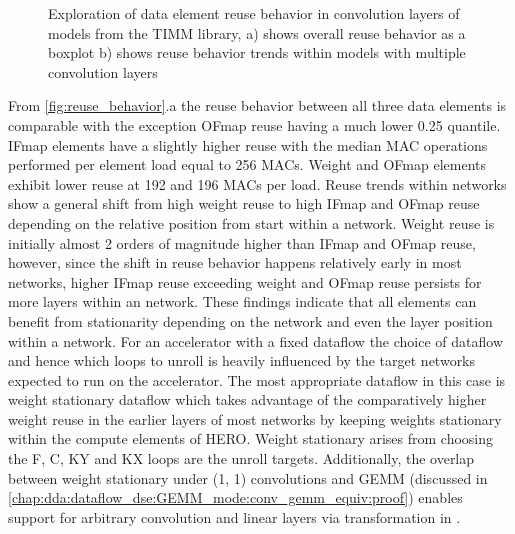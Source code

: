\begin{figure}
    \centering
    \caption{Exploration of data element reuse behavior in convolution layers of models from the TIMM library, a) shows overall reuse behavior as a boxplot b) shows reuse behavior trends within models with multiple convolution layers}
    \label{fig:reuse_behavior}
\end{figure}


From \autoref{fig:reuse_behavior}.a the reuse behavior between all three data
elements is comparable with the exception OFmap reuse having a much lower 0.25
quantile. IFmap elements have a slightly higher reuse with the median MAC
operations performed per element load equal to 256 MACs. Weight and OFmap
elements exhibit lower reuse at 192 and 196 MACs per load. Reuse trends within
networks show a general shift from high weight reuse to high IFmap and OFmap
reuse depending on the relative position from start within a network. Weight
reuse is initially almost 2 orders of magnitude higher than IFmap and OFmap
reuse, however, since the shift in reuse behavior happens relatively early in
most networks, higher IFmap reuse exceeding weight and OFmap reuse persists for
more layers within an network. These findings indicate that all elements can
benefit from stationarity depending on the network and even the layer position
within a network. For an accelerator with a fixed dataflow the choice of
dataflow and hence which loops to unroll is heavily influenced by the target
networks expected to run on the accelerator. The most appropriate dataflow in this
case is weight stationary dataflow which takes advantage of the comparatively higher weight
reuse in the earlier layers of most networks by keeping weights stationary
within the compute elements of HERO. Weight stationary arises from choosing the F, C, KY and KX loops are the
unroll targets. Additionally, the overlap between weight stationary under (1, 1)
convolutions and GEMM (discussed in 
\autoref{chap:dda:dataflow_dse:GEMM_mode:conv_gemm_equiv:proof}) enables support for arbitrary convolution and
linear layers via transformation in \cite{cafe_con_troll}.

